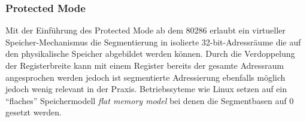 \subsubsection{Protected Mode}

Mit der Einführung des Protected Mode ab dem 80286 erlaubt ein virtueller Speicher-Mechanismus die Segmentierung in isolierte 32-bit-Adressräume die auf den physikalische Speicher abgebildet werden können. Durch die Verdoppelung der Registerbreite kann mit einem Register bereits der gesamte Adressraum angesprochen werden jedoch ist segmentierte Adressierung ebenfalls möglich jedoch wenig relevant  in der Praxis. Betriebssyteme wie Linux setzen auf ein ``flaches'' Speichermodell \emph{flat memory model} bei denen die Segmentbasen auf 0 gesetzt werden.

